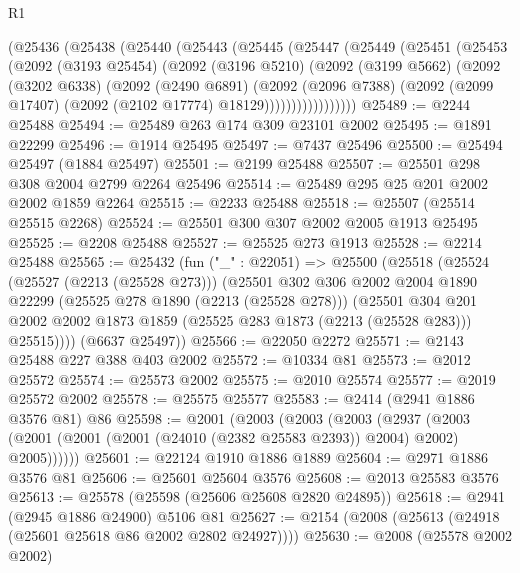 \begin{lexlean}{R1}
\begin{coremodule}
    (@25436
      (@25438
        (@25440
          (@25443
            (@25445
              (@25447
                (@25449
                  (@25451
                    (@25453
                      (@2092
                        (@3193 @25454)
                        (@2092
                          (@3196 @5210)
                          (@2092
                            (@3199 @5662)
                            (@2092
                              (@3202 @6338)
                              (@2092
                                (@2490 @6891)
                                (@2092
                                  (@2096 @7388)
                                  (@2092
                                    (@2099 @17407)
                                    (@2092 (@2102 @17774) @18129)))))))))))))))))
@25489 := @2244 @25488
@25494 := @25489 @263 @174 @309 @23101 @2002
@25495 := @1891 @22299
@25496 := @1914 @25495
@25497 := @7437 @25496
@25500 := @25494 @25497 (@1884 @25497)
@25501 := @2199 @25488
@25507 := @25501 @298 @308 @2004 @2799 @2264 @25496
@25514 := @25489 @295 @25 @201 @2002 @2002 @1859 @2264
@25515 := @2233 @25488
@25518 := @25507 (@25514 @25515 @2268)
@25524 := @25501 @300 @307 @2002 @2005 @1913 @25495
@25525 := @2208 @25488
@25527 := @25525 @273 @1913
@25528 := @2214 @25488
@25565 := @25432
    (fun ("_" : @22051) =>
    @25500
      (@25518
        (@25524
          (@25527 (@2213 (@25528 @273)))
          (@25501
            @302
            @306
            @2002
            @2004
            @1890
            @22299
            (@25525 @278 @1890 (@2213 (@25528 @278)))
            (@25501
              @304
              @201
              @2002
              @2002
              @1873
              @1859
              (@25525 @283 @1873 (@2213 (@25528 @283)))
              @25515))))
      (@6637 @25497))
@25566 := @22050 @2272
@25571 := @2143 @25488 @227 @388 @403 @2002
@25572 := @10334 @81
@25573 := @2012 @25572
@25574 := @25573 @2002
@25575 := @2010 @25574
@25577 := @2019 @25572 @2002
@25578 := @25575 @25577
@25583 := @2414 (@2941 @1886 @3576 @81) @86
@25598 := @2001
    (@2003
      (@2003
        (@2003
          (@2937 (@2003 (@2001 (@2001 (@2001 (@24010 (@2382 @25583 @2393)) @2004) @2002) @2005))))))
@25601 := @22124 @1910 @1886 @1889
@25604 := @2971 @1886 @3576 @81
@25606 := @25601 @25604 @3576
@25608 := @2013 @25583 @3576
@25613 := @25578 (@25598 (@25606 @25608 @2820 @24895))
@25618 := @2941 (@2945 @1886 @24900) @5106 @81
@25627 := @2154 (@2008 (@25613 (@24918 (@25601 @25618 @86 @2002 @2802 @24927))))
@25630 := @2008 (@25578 @2002 @2002)

\end{coremodule}
\end{lexlean}
